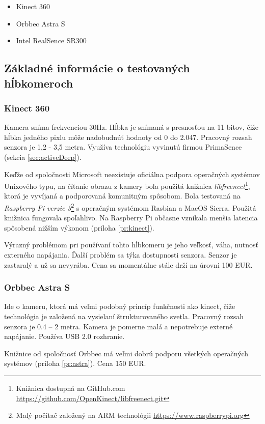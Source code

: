 \begin{itemize}
\item Kinect 360
\item Orbbec Astra S
\item Intel RealSence SR300

\end{itemize}


\subsection{Základné informácie o testovaných hĺbkomeroch}
\subsubsection{Kinect 360}
Kamera sníma frekvenciou 30Hz. Hĺbka je snímaná s presnosťou na 11 bitov, čiže hĺbka jedného pixlu môže nadobudnúť hodnoty od 0 do 2.047.  Pracovný rozsah senzora je  1,2 - 3,5 metra.  Využíva technológiu vyvinutú firmou PrimaSence (sekcia \ref{sec:activeDeep}).

Keďže od spoločnosti Microsoft neexistuje oficiálna podpora operačných systémov Unixového typu, na čítanie obrazu z kamery bola použitá knižnica \textit{libfreenect}\footnote{Knižnica dostupná na GitHub.com \url{https://github.com/OpenKinect/libfreenect.git}}, ktorá je vyvíjaná a podporovaná komunitným spôsobom. Bola testovaná na \textit{Raspberry Pi verzie 3}\footnote{Malý počítač založený na ARM technológii \url{https://www.raspberrypi.org}} s operačným systémom Rasbian a MacOS Sierra. Použitá knižnica fungovala spoľahlivo. Na Raspberry Pi občasne vznikala menšia latencia spôsobená nižším výkonom (príloha \ref{pr:kinect}).

Výrazný problémom pri používaní tohto hĺbkomeru je jeho veľkosť, váha, nutnosť externého napájania. Ďalší problém sa týka dostupnosti senzora. Senzor je zastaralý a už sa nevyrába. Cena sa momentálne stále drží na úrovni 100 EUR. 

\subsubsection{Orbbec Astra S}
Ide o kameru, ktorá má veľmi podobný princíp funkčnosti ako kinect, čiže technológia je založená na vysielaní štrukturovaného svetla. Pracovný rozsah senzora je 0.4 – 2 metra. Kamera je pomerne malá a nepotrebuje externé napájanie. Používa USB 2.0 rozhranie. 

Knižnice od spoločnosť Orbbec má veľmi dobrú podporu všetkých operačných systémov (príloha \ref{pr:astra}). Cena 150 EUR. 


